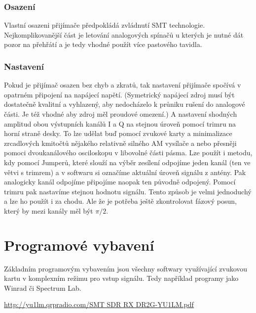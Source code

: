 \documentclass[12pt,a4paper,oneside]{article}
\begin{document}
\subsubsection{Osazení}
Vlastní osazeni přijímače předpokládá zvládnutí SMT technologie. Nejkomplikovanější část je letování analogových spínačů u kterých je nutné dát pozor na přehřátí a je tedy vhodné použít více pastového tavidla.

\subsubsection{Nastavení}
Pokud je přijímač osazen bez chyb a zkratů, tak nastavení přijímače spočívá v opatrném připojení na napájecí napětí. (Symetrický napájecí zdroj musí být dostatečně kvalitní a vyhlazený, aby nedocházelo k průniku rušení do analogové části. Je též vhodné aby zdroj měl proudové omezení.) A nastavení shodných amplitud obou výstupních kanálů I a Q na stejnou úroveň pomocí trimru na horní straně desky. To lze udělat buď pomocí zvukové karty a minimalizace zrcadlových kmitočtů nějakého relativně silného AM vysílače a nebo přesněji pomoci dvoukanálového osciloskopu v libovolné části pásma. Lze použít i metodu, kdy pomocí Jumperů, které slouží na výběr zesílení odpojíme jeden kanál (ten ve větvi s trimrem) a v softwaru si označíme aktuální úroveň signálu z antény. Pak analogicky kanál odpojíme připojíme naopak ten původně odpojený. Pomocí trimru pak nastavíme stejnou hodnotu signálu. Tento způsob je velmi jednoduchý a lze ho použít i za chodu. Ale že je potřeba ještě zkontrolovat fázový posun, který by mezi kanály měl být $\pi / 2$. 

\section{Programové vybavení}

Základním programovým vybavením jsou všechny softwary využívající zvukovou kartu v komplexním režimu  pro vstup signálu. Tedy například programy jako Winrad či Spectrum Lab.

\begin{thebibliography}{99}
\href{http://yu1lm.qrpradio.com/SMT SDR RX DR2G-YU1LM.pdf}{http://yu1lm.qrpradio.com/SMT SDR RX DR2G-YU1LM.pdf}

\end{thebibliography}
\end{document}
